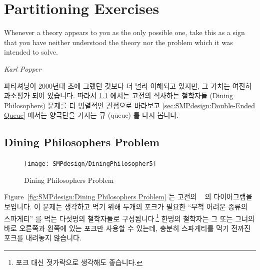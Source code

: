 
\section{Partitioning Exercises}
\label{sec:SMPdesign:Partitioning Exercises}
%
\epigraph{Whenever a theory appears to you as the only possible one,
	  take this as a sign that you have neither understood the theory
	  nor the problem which it was intended to solve.}
	  {\emph{Karl Popper}}

파티셔닝이 2000년대 초에 그랬던 것보다 더 널리 이해되고 있지만, 그 가치는
여전히 과소평가 되어 있습니다.
따라서
\cref{sec:SMPdesign:Dining Philosophers Problem}
에서는 고전의 식사하는 철학자들 (Dining Philosophers) 문제를 더 병렬적인
관점으로 바라보고
\cref{sec:SMPdesign:Double-Ended Queue}
에서는 양극단을 가지는 큐 (queue) 를 다시 봅니다.

\subsection{Dining Philosophers Problem}
\label{sec:SMPdesign:Dining Philosophers Problem}

\begin{figure}[tb]
\centering
\texttt{[image: SMPdesign/DiningPhilosopher5]}
\caption{Dining Philosophers Problem}
\end{figure}

Figure~\ref{fig:SMPdesign:Dining Philosophers Problem} 는 고전의
~\cite{Dijkstra1971HOoSP} 의 다이어그램을
보입니다.
이 문제는 생각하고 먹기 위해 두개의 포크가 필요한 ``무척 어려운 종류의
스파게티'' 를 먹는 다섯명의 철학자들로 구성됩니다.\footnote{
	포크 대신 젓가락으로 생각해도 좋습니다.}
한명의 철학자는 그 또는 그녀의 바로 오른쪽과 왼쪽에 있는 포크만 사용할 수
있는데, 충분히 스파게티를 먹기 전까진 포크를 내려놓지 않습니다.

